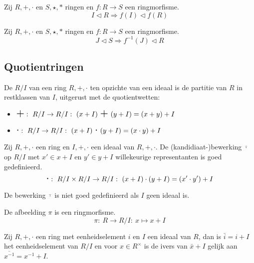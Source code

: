 \documentclass[main.tex]{subfiles}
\begin{document}
\begin{pr}
  Zij $R,+,\cdot$ en $S,\star,*$ ringen en $f: R\rightarrow S$ een ringmorfisme.
  \[ I \triangleleft R \Rightarrow f(I) \triangleleft f(R) \]
\end{pr}

\begin{pr}
  Zij $R,+,\cdot$ en $S,\star,*$ ringen en $f: R\rightarrow S$ een ringmorfisme.
  \[ J \triangleleft S \Rightarrow f^{-1}(J) \triangleleft R \]
\end{pr}


\subsection{Quotientringen}
\label{sec:quotientringen}


\begin{de}
  De  $R/I$ van een ring $R,+,\cdot$ ten opzichte van een ideaal is de partitie van $R$ in restklassen van $I$, uitgerust met de quotientwetten:
  \begin{itemize}
  \item $\scalebox{1.5}{$+$}:\ R/I \rightarrow R/I:\ (x+I)\ \scalebox{1.5}{$+$}\ (y+I) = (x+y)+I$
  \item $\scalebox{1.5}{$\cdot$}:\ R/I \rightarrow R/I:\ (x+I)\ \scalebox{1.5}{$\cdot$}\ (y+I) = (x\cdot y) + I$
  \end{itemize}
\end{de}

\begin{pr}
  Zij $R,+,\cdot$ een ring en $I,+,\cdot$ een ideaal van $R,+,\cdot$.
  De (kandidiaat-)bewerking $\bar{\cdot}$ op $R/I$ met $x'\in x+I$ en $y'\in y+I$ willekeurige representanten is goed gedefinieerd.
  \[ \scalebox{1.5}{$\cdot$}:\ R/I \times R/I \rightarrow R/I:\ (x+I) \cdot (y+I) = (x'\cdot y') + I \]
\end{pr}

\begin{opm}
  De bewerking $\bar{\cdot}$ is niet goed gedefinieerd als $I$ geen ideaal is.
\end{opm}

\begin{pr}
  De afbeelding $\pi$ is een ringmorfisme.
  \[ \pi:\ R \rightarrow R/I:\ x \mapsto x+I \]
\end{pr}

\begin{st}
  Zij $R,+,\cdot$ een ring met eenheidselement $i$ en $I$ een ideaal van $R$, dan is $\bar{i} = i + I$ het eenheidselement van $R/I$ en voor $x\in R^{\times}$ is de ivers van $\bar{x} + I$ gelijk aan $\overline{x^{-1}} = x^{-1} + I$. 
\end{st}
\end{document}
